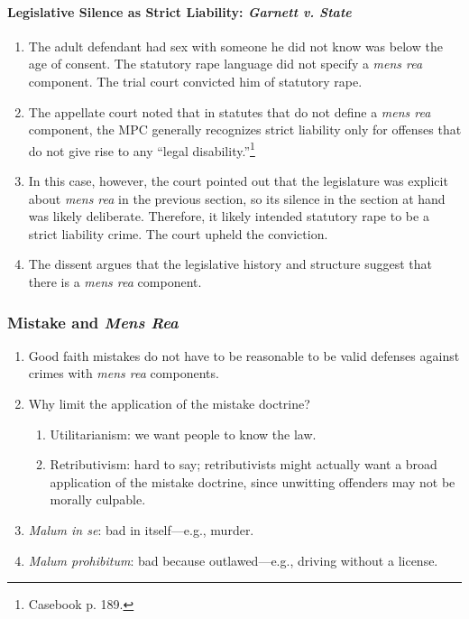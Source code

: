 \paragraph{Legislative Silence as Strict Liability: \emph{Garnett v. State}}

\begin{enumerate}
    \item The adult defendant had sex with someone he did not know was below the age of consent. The statutory rape language did not specify a \emph{mens rea} component. The trial court convicted him of statutory rape.
    \item The appellate court noted that in statutes that do not define a \emph{mens rea} component, the MPC generally recognizes strict liability only for offenses that do not give rise to any ``legal disability.''\footnote{Casebook p. 189.}
    \item In this case, however, the court pointed out that the legislature was explicit about \emph{mens rea} in the previous section, so its silence in the section at hand was likely deliberate. Therefore, it likely intended statutory rape to be a strict liability crime. The court upheld the conviction.
    \item The dissent argues that the legislative history and structure suggest that there is a \emph{mens rea} component.
\end{enumerate}

\subsubsection{Mistake and \emph{Mens Rea}}

\begin{enumerate}
    \item Good faith mistakes do not have to be reasonable to be valid defenses against crimes with \emph{mens rea} components.
    \item Why limit the application of the mistake doctrine?
    \begin{enumerate}
        \item Utilitarianism: we want people to know the law.
        \item Retributivism: hard to say; retributivists might actually want a broad application of the mistake doctrine, since unwitting offenders may not be morally culpable.
    \end{enumerate}
    \item \emph{Malum in se}: bad in itself---e.g., murder.
    \item \emph{Malum prohibitum}: bad because outlawed---e.g., driving without a license.
\end{enumerate}

